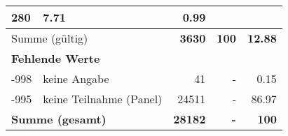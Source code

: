 \begin{longtable}{lXrrr}
       \num{280} &
       \num[round-mode=places,round-precision=2]{7,71} &
         \num[round-mode=places,round-precision=2]{0,99} \\
     \midrule
     \multicolumn{2}{l}{Summe (gültig)} &
       \textbf{\num{3630}} &
     \textbf{100} &
       \textbf{\num[round-mode=places,round-precision=2]{12,88}} \\
     \multicolumn{5}{l}{\textbf{Fehlende Werte}}\\
       -998 &
       keine Angabe &
         \num{41} &
        - &
         \num[round-mode=places,round-precision=2]{0,15} \\
       -995 &
       keine Teilnahme (Panel) &
         \num{24511} &
        - &
         \num[round-mode=places,round-precision=2]{86,97} \\
     \midrule
     \multicolumn{2}{l}{\textbf{Summe (gesamt)}} &
          \textbf{\num{28182}} &
        \textbf{-} &
        \textbf{100} \\
     \bottomrule
     \end{longtable}
     
